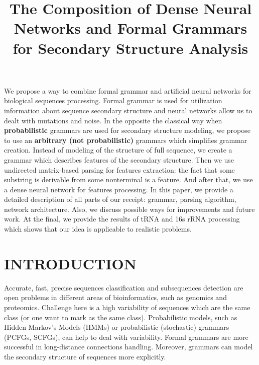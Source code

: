 \documentclass[a4paper,twoside]{article}
\begin{document}
\title{The Composition of Dense Neural Networks and Formal Grammars for Secondary Structure Analysis}

\author{
}


\abstract
{
We propose a way to combine formal grammar and artificial neural networks for biological sequences processing.
Formal grammar is used for utilization information about sequence secondary structure and neural networks allow us to dealt with mutations and noise.
In the opposite the classical way when \textbf{probabilistic} grammars are used for secondary structure modeling, we propose to use an \textbf{arbitrary (not probabilistic)} grammars which simplifies grammar creation.
Instead of modeling of the structure of full sequence, we create a grammar which describes features of the secondary structure.
Then we use undirected matrix-based parsing for features extraction: the fact that some substring is derivable from some nonterminal is a feature. 
And after that, we use a dense neural network for features processing.
In this paper, we provide a detailed description of all parts of our receipt: grammar, parsing algorithm, network architecture.
Also, we discuss possible ways for improvements and future work.
At the final, we provide the results of tRNA and 16s rRNA processing which shows that our idea is applicable to realistic problems.
}

\onecolumn \maketitle \normalsize \vfill

\section{\uppercase{Introduction}}
\label{sec:introduction}

\noindent Accurate, fast, precise sequences classification and subsequences detection are open problems in different areas of bioinformatics, such as genomics and proteomics. 
Challenge here is a high variability of sequences which are the same class (or one want to mark as the same class).
Probabilistic models, such as Hidden Markov's Models (HMMs) or probabilistic (stochastic) grammars (PCFGs, SCFGs), can help to deal with variability.
Formal grammars are more successful in long-distance connections handling.
Moreover, grammars can model the secondary structure of sequences more explicitly.
\end{document}
